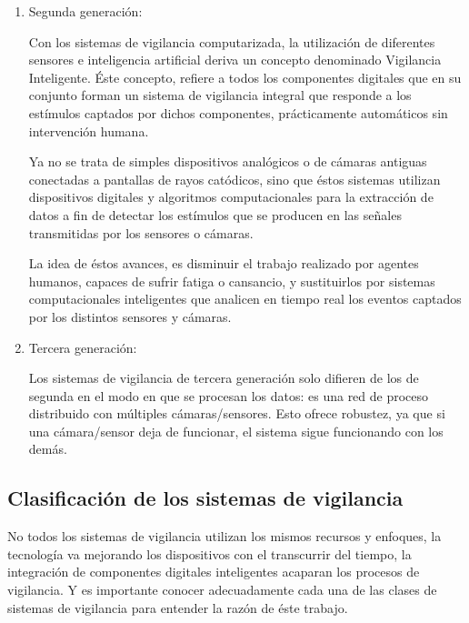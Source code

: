 \documentclass[a4paper,12pt,oneside,spanish]{book}
\begin{document}
\begin{enumerate}
	\item Segunda generación: \par
	Con los sistemas de vigilancia computarizada, la utilización de diferentes sensores e inteligencia artificial deriva un concepto denominado Vigilancia Inteligente. Éste concepto, refiere a todos los componentes digitales que en su conjunto forman un sistema de vigilancia integral que responde a los estímulos captados por dichos componentes, prácticamente automáticos sin intervención humana. \par
	Ya no se trata de simples dispositivos analógicos o de cámaras antiguas conectadas a pantallas de rayos catódicos, sino que éstos sistemas utilizan dispositivos digitales y algoritmos computacionales para la extracción de datos a fin de detectar los estímulos que se producen en las señales transmitidas por los sensores o cámaras.
	\par
	La idea de éstos avances, es disminuir el trabajo realizado por agentes humanos, capaces de sufrir fatiga o cansancio, y sustituirlos por sistemas computacionales inteligentes que analicen en tiempo real los eventos captados por los distintos sensores y cámaras.\\
	
	\item Tercera generación: \par
	Los sistemas de vigilancia de tercera generación solo difieren de los de segunda en el modo en que se procesan los datos: es una red de proceso distribuido con múltiples cámaras/sensores. Esto ofrece robustez, ya que si una cámara/sensor deja de funcionar, el sistema sigue funcionando con los demás.
\end{enumerate}	\baselineskip 16pt



\subsection{Clasificación de los sistemas de vigilancia}

No todos los sistemas de vigilancia utilizan los mismos recursos y enfoques, la tecnología va mejorando los dispositivos con el transcurrir del tiempo, la integración de componentes digitales inteligentes acaparan los procesos de vigilancia. Y es importante conocer adecuadamente cada una de las clases de sistemas de vigilancia para entender la razón de éste trabajo.  \par
\end{document}
